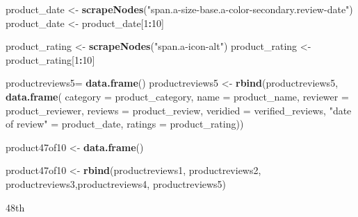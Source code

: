 \documentclass[
]{article}
\newenvironment{Shaded}{\begin{snugshade}}{\end{snugshade}}
\newcommand{\AttributeTok}[1]{\textcolor[rgb]{0.13,0.29,0.53}{#1}}
\newcommand{\DecValTok}[1]{\textcolor[rgb]{0.00,0.00,0.81}{#1}}
\newcommand{\FunctionTok}[1]{\textcolor[rgb]{0.13,0.29,0.53}{\textbf{#1}}}
\newcommand{\NormalTok}[1]{#1}
\newcommand{\OtherTok}[1]{\textcolor[rgb]{0.56,0.35,0.01}{#1}}
\newcommand{\SpecialCharTok}[1]{\textcolor[rgb]{0.81,0.36,0.00}{\textbf{#1}}}
\newcommand{\StringTok}[1]{\textcolor[rgb]{0.31,0.60,0.02}{#1}}
\begin{document}
\begin{Shaded}
\begin{Highlighting}[]
\NormalTok{  product\_date }\OtherTok{\textless{}{-}} \FunctionTok{scrapeNodes}\NormalTok{(}\StringTok{"span.a{-}size{-}base.a{-}color{-}secondary.review{-}date"}\NormalTok{)}
\NormalTok{  product\_date }\OtherTok{\textless{}{-}}\NormalTok{ product\_date[}\DecValTok{1}\SpecialCharTok{:}\DecValTok{10}\NormalTok{]}
  
\NormalTok{  product\_rating }\OtherTok{\textless{}{-}} \FunctionTok{scrapeNodes}\NormalTok{(}\StringTok{"span.a{-}icon{-}alt"}\NormalTok{)}
\NormalTok{  product\_rating }\OtherTok{\textless{}{-}}\NormalTok{ product\_rating[}\DecValTok{1}\SpecialCharTok{:}\DecValTok{10}\NormalTok{]}
  
\NormalTok{  productreviews5}\OtherTok{=} \FunctionTok{data.frame}\NormalTok{()}
\NormalTok{  productreviews5 }\OtherTok{\textless{}{-}} \FunctionTok{rbind}\NormalTok{(productreviews5, }\FunctionTok{data.frame}\NormalTok{(}
                      \AttributeTok{category =}\NormalTok{ product\_category,}
                      \AttributeTok{name =}\NormalTok{ product\_name,}
                      \AttributeTok{reviewer =}\NormalTok{ product\_reviewer,}
                      \AttributeTok{reviews =}\NormalTok{ product\_review,}
                      \AttributeTok{veridied =}\NormalTok{ verified\_reviews,}
                      \StringTok{"date of review"} \OtherTok{=}\NormalTok{ product\_date,}
                      \AttributeTok{ratings =}\NormalTok{ product\_rating))}
  
\NormalTok{  product47of10 }\OtherTok{\textless{}{-}} \FunctionTok{data.frame}\NormalTok{()}
  
\NormalTok{  product47of10 }\OtherTok{\textless{}{-}} \FunctionTok{rbind}\NormalTok{(productreviews1, productreviews2, productreviews3,productreviews4, productreviews5)}
\end{Highlighting}
\end{Shaded}

48th
\end{document}
